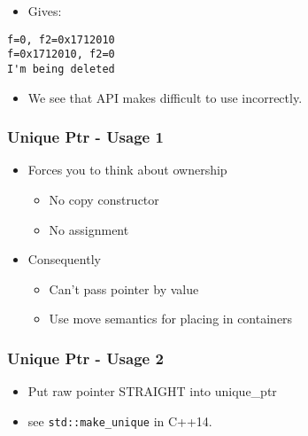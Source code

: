 \begin{itemize}
\itemsep1pt\parskip0pt
\item
  Gives:
\end{itemize}

\begin{verbatim}
f=0, f2=0x1712010
f=0x1712010, f2=0
I'm being deleted
\end{verbatim}

\begin{itemize}
\itemsep1pt\parskip0pt
\item
  We see that API makes difficult to use incorrectly.
\end{itemize}

\subsubsection{Unique Ptr - Usage 1}\label{unique-ptr---usage-1}

\begin{itemize}
\itemsep1pt\parskip0pt
\item
  Forces you to think about ownership

  \begin{itemize}
  \itemsep1pt\parskip0pt
  \item
    No copy constructor
  \item
    No assignment
  \end{itemize}
\item
  Consequently

  \begin{itemize}
  \itemsep1pt\parskip0pt
  \item
    Can't pass pointer by value
  \item
    Use move semantics for placing in containers
  \end{itemize}
\end{itemize}

\subsubsection{Unique Ptr - Usage 2}\label{unique-ptr---usage-2}

\begin{itemize}
\itemsep1pt\parskip0pt
\item
  Put raw pointer STRAIGHT into unique\_ptr
\item
  see \texttt{std::make\_unique} in C++14.
\end{itemize}

